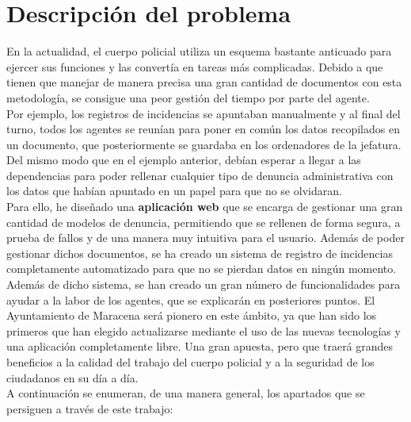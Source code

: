 \chapter{Descripción del problema}

En la actualidad, el cuerpo policial utiliza un esquema bastante anticuado para ejercer sus funciones y las convertía en tareas más complicadas. Debido a que tienen 
que manejar de manera precisa una gran cantidad de documentos con esta metodología, se consigue una peor gestión del tiempo por parte del agente.\\

Por ejemplo, los registros de incidencias se apuntaban manualmente y al final del turno, todos los agentes se reunían para poner 
en común los datos recopilados en un documento, que posteriormente se guardaba en los ordenadores de la jefatura. Del mismo modo que en el ejemplo anterior, debían 
esperar a llegar a las dependencias para poder rellenar cualquier tipo de denuncia administrativa con los datos que habían
apuntado en un papel para que no se olvidaran.\\

Para ello, he diseñado una \textbf{aplicación web} que se encarga de gestionar una gran cantidad de 
modelos de denuncia, permitiendo que se rellenen de forma segura, a prueba de 
fallos y de una manera muy intuitiva para el usuario. Además de poder gestionar dichos documentos,
se ha creado un sistema de registro de incidencias completamente automatizado para que no se pierdan datos en ningún momento. Además de dicho sistema, se han creado un gran número de funcionalidades para ayudar a la labor de los agentes, que se explicarán en 
posteriores puntos. El Ayuntamiento de Maracena será pionero en este ámbito, ya que han sido los 
primeros que han elegido actualizarse mediante el uso de las nuevas tecnologías y una aplicación completamente libre. Una gran apuesta, pero que traerá grandes
beneficios a la calidad del trabajo del cuerpo policial y a la seguridad de los ciudadanos en su día a día. \\

A continuación se enumeran, de una manera general, los apartados que se persiguen a través de este trabajo:

